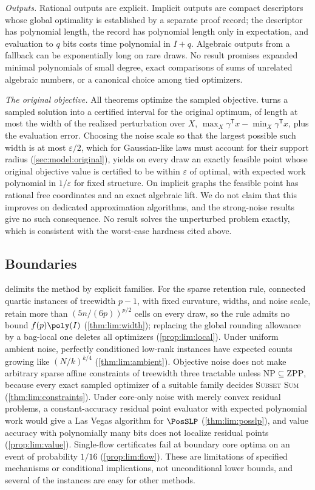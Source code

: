 \emph{Outputs.} Rational outputs are explicit. Implicit outputs are compact
descriptors whose global optimality is established by a separate proof
record; the descriptor has polynomial length, the record has polynomial
length only in expectation, and evaluation to $q$ bits costs time
polynomial in $I+q$. Algebraic outputs from a fallback can be exponentially
long on rare draws. No result promises expanded minimal polynomials of small
degree, exact comparisons of sums of unrelated algebraic numbers, or a
canonical choice among tied optimizers.

\emph{The original objective.} All theorems optimize the sampled objective.
 turns a sampled solution into a certified interval
for the original optimum, of length at most the width of the realized
perturbation over $X$, $\max_X\gamma^{\mathsf T}x-\min_X\gamma^{\mathsf T}x$,
plus the evaluation error. Choosing the noise scale so that the largest
possible such width is at most $\varepsilon/2$, which for Gaussian-like laws
must account for their support radius (\cref{sec:model:original}), yields
on every draw an exactly feasible point whose original objective value is
certified to be within $\varepsilon$ of optimal, with expected work
polynomial in $1/\varepsilon$ for fixed structure. On implicit graphs the
feasible point has rational free coordinates and an exact algebraic lift. We
do not claim that this improves on dedicated approximation algorithms, and
the strong-noise results give no such consequence. No result solves the unperturbed problem exactly,
which is consistent with the worst-case hardness cited above.

\subsection{Boundaries}\label{sec:intro:boundaries}

 delimits the method by explicit families. For the sparse
retention rule, connected quartic instances of treewidth $p-1$, with fixed
curvature, widths, and noise scale, retain more than $(5n/(6p))^{p/2}$ cells
on every draw, so the rule admits no bound $f(p)\poly(I)$
(\cref{thm:lim:width}); replacing the global rounding allowance by a bag-local
one deletes all optimizers (\cref{prop:lim:local}). Under uniform ambient
noise, perfectly conditioned low-rank instances have expected counts growing
like $(N/k)^{k/4}$ (\cref{thm:lim:ambient}). Objective noise does not make
arbitrary sparse affine constraints of treewidth three tractable unless
$\mathrm{NP}\subseteq\mathrm{ZPP}$, because every exact sampled optimizer of
a suitable family decides \textsc{Subset Sum} (\cref{thm:lim:constraints}).
Under core-only noise with merely convex
residual problems, a constant-accuracy residual point evaluator with
expected polynomial work would give a Las Vegas algorithm for $\PosSLP$
(\cref{thm:lim:posslp}), and value accuracy with polynomially many bits does
not localize residual points (\cref{prop:lim:value}). Single-flow
certificates fail at boundary core optima on an event of probability
$1/16$ (\cref{prop:lim:flow}). These are limitations of specified mechanisms
or conditional implications, not unconditional lower bounds, and several of
the instances are easy for other methods.

